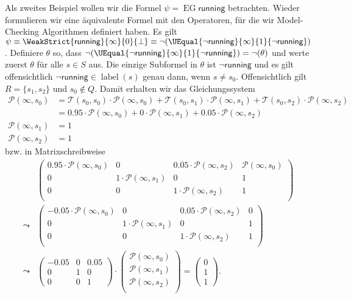 Als zweites Beispiel wollen wir die Formel $\psi=\operatorname{EG} \mathsf{running}$ betrachten. 
Wieder formulieren wir eine äquivalente Formel mit den Operatoren, für die wir Model-Checking Algorithmen definiert haben. 
Es gilt $\psi\equiv \WeakStrict{\mathsf{running}}{\infty}{0}{\bot} \equiv \neg(\UEqual{\neg\mathsf{running}}{\infty}{1}{\neg\mathsf{running}})$. 
Definiere $\theta$ so, dass $\neg(\UEqual{\neg\mathsf{running}}{\infty}{1}{\neg\mathsf{running}}) = \neg(\theta)$ und werte zuerst $\theta$ für alle $s\in S$ aus. 
Die einzige Subformel in $\theta$ ist $\neg\mathsf{running}$ und es gilt offensichtlich $\neg\mathsf{running}\in \operatorname{label}(s)$ genau dann, wenn $s\neq s_0$. 
Offensichtlich gilt $R=\{s_1,s_2\}$ und $s_0\notin Q$. 
Damit erhalten wir das Gleichungssystem
\begin{align*}
	\mathcal{P}(\infty,s_0) &= \mathcal{T}(s_0, s_0) \cdot \mathcal{P}(\infty,s_0) + \mathcal{T}(s_0, s_1) \cdot \mathcal{P}(\infty,s_1) + \mathcal{T}(s_0, s_2) \cdot \mathcal{P}(\infty,s_2) \\
	&= 0.95\cdot \mathcal{P}(\infty,s_0) + 0\cdot \mathcal{P}(\infty,s_1) + 0.05\cdot \mathcal{P}(\infty,s_2) \\
	\mathcal{P}(\infty,s_1) &= 1 \\
	\mathcal{P}(\infty,s_2) &= 1
\end{align*}
bzw. in Matrixschreibweise
\begin{align*}
	&\left(\begin{array}{ccc|c}
		0.95\cdot \mathcal{P}(\infty,s_0) & 0 & 0.05\cdot\mathcal{P}(\infty,s_2) & \mathcal{P}(\infty,s_0) \\
		0 & 1\cdot \mathcal{P}(\infty,s_1) & 0 & 1 \\
		0 & 0 & 1\cdot \mathcal{P}(\infty,s_2) & 1 \\
	\end{array}\right)\\
	\leadsto
	&\left(\begin{array}{ccc|c}
		-0.05\cdot \mathcal{P}(\infty,s_0) & 0 & 0.05\cdot\mathcal{P}(\infty,s_2) & 0 \\
		0 & 1\cdot \mathcal{P}(\infty,s_1) & 0 & 1 \\
		0 & 0 & 1\cdot \mathcal{P}(\infty,s_2) & 1 \\
	\end{array}\right)\\
	\leadsto
	&\begin{pmatrix}
		-0.05 & 0 & 0.05 \\
		0 & 1 & 0 \\
		0 & 0 & 1
	\end{pmatrix} 
	\cdot 
	\begin{pmatrix}
		\mathcal{P}(\infty, s_0) \\
		\mathcal{P}(\infty, s_1) \\
		\mathcal{P}(\infty, s_2) \\
	\end{pmatrix}
	=
	\begin{pmatrix}
		0 \\ 1 \\ 1
	\end{pmatrix}.
\end{align*}

